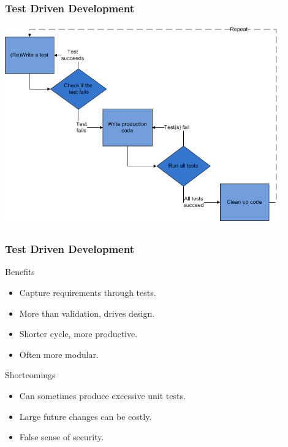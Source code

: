 \begin{frame}
  \frametitle{Test Driven Development}
  \includegraphics[width=0.9\textwidth]{tdd_cycle.png}
\end{frame}

\begin{frame}
  \frametitle{Test Driven Development}
  \begin{block}{Benefits}
    \begin{itemize}
    \item Capture requirements through tests.
    \item More than validation, drives design.
    \item Shorter cycle, more productive.
    \item Often more modular.
    \end{itemize}
  \end{block}
  \begin{block}{Shortcomings}
    \begin{itemize}
    \item Can sometimes produce excessive unit tests.
    \item Large future changes can be costly.
    \item False sense of security.
    \end{itemize}
  \end{block}
\end{frame}
